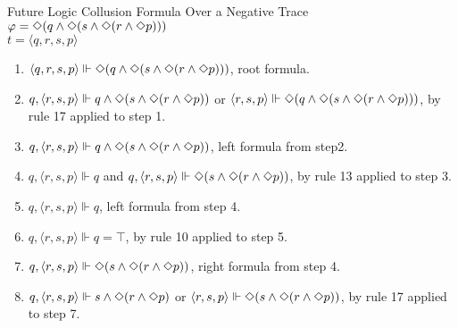\begin{myEx} Future Logic Collusion Formula Over a Negative Trace\\

$\varphi = \Diamond(q \land \Diamond(s \land \Diamond(r \land \Diamond p)))$\\
\indent $t = \langle q, r, s, p \rangle$

\begin{enumerate}
\item $\langle q,r,s,p \rangle \Vdash \Diamond(q \land \Diamond(s \land \Diamond(r \land \Diamond p)))$, root formula.\\ %

\item $q, \langle r,s,p \rangle \Vdash q \land \Diamond(s \land \Diamond(r \land \Diamond p))$ or $\langle r,s,p \rangle \Vdash \Diamond(q \land \Diamond(s \land \Diamond(r \land \Diamond p)))$, by rule 17 applied to step 1.\\ %

\item $q, \langle r,s,p \rangle \Vdash q \land \Diamond(s \land \Diamond(r \land \Diamond p))$, left formula from step2.\\ %

\item $q, \langle r,s,p \rangle \Vdash q$ and $q, \langle r,s,p \rangle \Vdash \Diamond(s \land \Diamond(r \land \Diamond p))$, by rule 13 applied to step 3.\\ %

\item $q, \langle r,s,p \rangle \Vdash q$, left formula from step 4.\\ %

\item $q, \langle r,s,p \rangle \Vdash q = \top$, by rule 10 applied to step 5.\\ %

\item $q, \langle r,s,p \rangle \Vdash \Diamond(s \land \Diamond(r \land \Diamond p))$, right formula from step 4.\\ %

\item $q, \langle r,s,p \rangle \Vdash s \land \Diamond(r \land \Diamond p)$ or $\langle r,s,p \rangle \Vdash \Diamond(s \land \Diamond(r \land \Diamond p))$, by rule 17 applied to step 7.\\ %


\end{enumerate}
\end{myEx}
